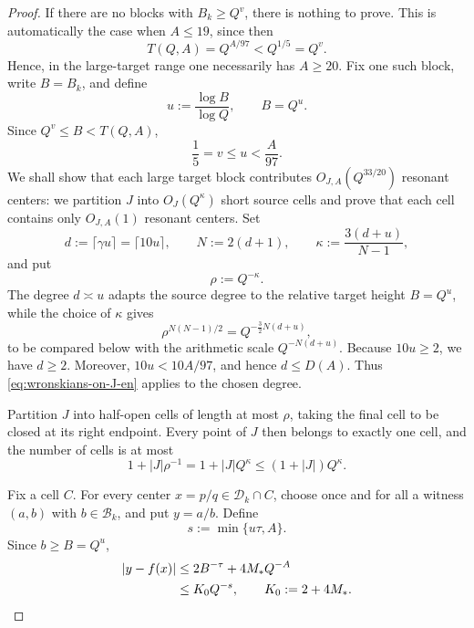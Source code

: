 \documentclass[11pt]{amsart}
\numberwithin{equation}{section}
\theoremstyle{definition}
\theoremstyle{remark}
\newcommand{\abs}[1]{\left\lvert #1\right\rvert}
\begin{document}
\begin{proof}
If there are no blocks with $B_k\geq Q^v$, there is nothing to prove. This is automatically the case when $A\leq 19$, since then
\[
T(Q,A)=Q^{A/97}<Q^{1/5}=Q^v.
\]
Hence, in the large-target range one necessarily has $A\geq 20$. Fix one such block, write $B=B_k$, and define
\begin{equation}\label{eq:u-definition-en}
u:=\frac{\log B}{\log Q},
\qquad B=Q^u.
\end{equation}
Since $Q^v\leq B<T(Q,A)$,
\begin{equation}\label{eq:u-range-en}
\frac15=v\leq u<\frac{A}{97}.
\end{equation}
We shall show that each large target block contributes 
$O_{J,A}(Q^{33/20})$ resonant centers: we partition $J$ into
$O_J(Q^\kappa)$ short source cells and prove that each cell contains
only $O_{J,A}(1)$ resonant centers.
Set
\begin{equation}\label{eq:d-N-kappa-en}
d:=\lceil\gamma u\rceil=\lceil10u\rceil,
\qquad
N:=2(d+1),
\qquad
\kappa:=\frac{3(d+u)}{N-1},
\end{equation}
and put
\begin{equation}\label{eq:rho-definition-en}
\rho:=Q^{-\kappa}.
\end{equation}
The degree $d\asymp u$ adapts the source degree to the relative target
height $B=Q^u$, while the choice of $\kappa$ gives
\[
\rho^{N(N-1)/2}=Q^{-\frac32N(d+u)},
\]
to be compared below with the arithmetic scale $Q^{-N(d+u)}$.
Because $10u\geq2$, we have $d\geq2$. Moreover,
$10u<10A/97$, and hence $d\leq D(A)$. Thus
\eqref{eq:wronskians-on-J-en} applies to the chosen degree.

Partition $J$ into half-open cells of length at most $\rho$, taking the
final cell to be closed at its right endpoint. Every point of $J$ then
belongs to exactly one cell, and the number of cells is at most
\begin{equation}\label{eq:number-cells-en}
1+|J|\rho^{-1}
=1+|J|Q^\kappa
\leq(1+|J|)Q^\kappa.
\end{equation}

Fix a cell $C$. For every center $x=p/q\in\mathcal D_k\cap C$, choose once and for all
a witness $(a,b)$ with $b\in\mathcal B_k$, and put $y=a/b$. Define
\begin{equation}\label{eq:s-definition-en}
s:=\min\{u\tau,A\}.
\end{equation}
Since $b\geq B=Q^u$,
\begin{align}
\abs{y-f(x)}
&\leq2B^{-\tau}+4M_*Q^{-A}\notag\\
&\leq K_0Q^{-s},
\qquad K_0:=2+4M_*.
\label{eq:vertical-Q-s-en}
\end{align}


\end{proof}
\end{document}
